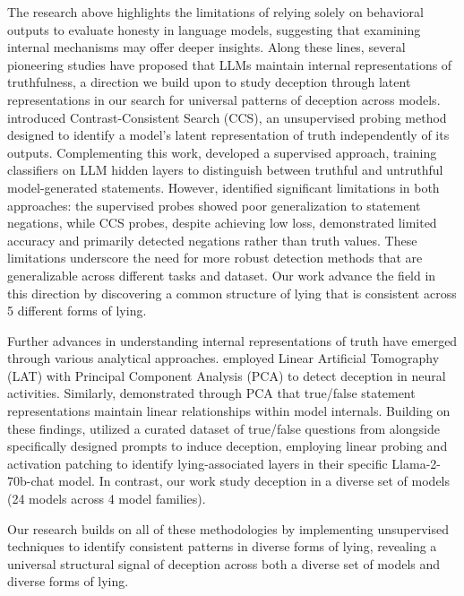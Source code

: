 \documentclass[]{paper}
\begin{document}
The research above highlights the limitations of relying solely on behavioral outputs to evaluate honesty in language models, suggesting that examining internal mechanisms may offer deeper insights. Along these lines, several pioneering studies have proposed that LLMs maintain internal representations of truthfulness, a direction we build upon to study deception through latent representations in our search for universal patterns of deception across models. \citet{burnsDiscoveringLatentKnowledge2024} introduced Contrast-Consistent Search (CCS), an unsupervised probing method designed to identify a model's latent representation of truth independently of its outputs. Complementing this work, \citet{azariaInternalStateLLM2023} developed a supervised approach, training classifiers on LLM hidden layers to distinguish between truthful and untruthful model-generated statements. However, \citet{levinsteinStillNoLie2023} identified significant limitations in both approaches: the supervised probes showed poor generalization to statement negations, while CCS probes, despite achieving low loss, demonstrated limited accuracy and primarily detected negations rather than truth values. These limitations underscore the need for more robust detection methods that are generalizable across different tasks and dataset. Our work advance the field in this direction by discovering a common structure of lying that is consistent across 5 different forms of lying.

Further advances in understanding internal representations of truth have emerged through various analytical approaches. \citet{zouRepresentationEngineeringTopApproach2023} employed Linear Artificial Tomography (LAT) with Principal Component Analysis (PCA) to detect deception in neural activities. Similarly, \citet{marksGeometryTruthEmergent2024} demonstrated through PCA that true/false statement representations maintain linear relationships within model internals. Building on these findings, \citet{campbellLocalizingLyingLlama2023} utilized a curated dataset of true/false questions from \citet{azariaInternalStateLLM2023} alongside specifically designed prompts to induce deception, employing linear probing and activation patching to identify lying-associated layers in their specific Llama-2-70b-chat model. In contrast, our work study deception in a diverse set of models (24 models across 4 model families).

Our research builds on all of these methodologies by implementing unsupervised techniques to identify consistent patterns in diverse forms of lying, revealing a universal structural signal of deception across both a diverse set of models and diverse forms of lying.
\end{document}
